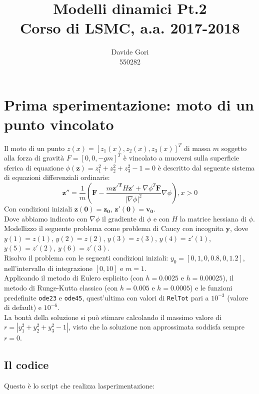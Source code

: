\documentclass{article}
\title{Modelli dinamici Pt.2\\
	Corso di LSMC, a.a. 2017-2018}
\author{Davide Gori\\
	550282}
\begin{document}
	\maketitle
	\section{Prima sperimentazione: moto di un punto vincolato}
	Il moto di un punto $z(x) = [z_1(x), z_2(x), z_3(x)]^T$ di massa $m$ soggetto alla forza di	gravità $F=[0, 0, -gm]^T$ è vincolato a muoversi sulla superficie sferica di equazione $\phi(\mathbf{z})=z_1^2+z_2^2+z_3^2-1=0$ è descritto dal seguente sistema di equazioni differenziali ordinarie:
	$$\mathbf{z}''=\frac{1}{m} \left(\mathbf{F}-\frac{m\mathbf{z'^T}H\mathbf{z'}+\nabla\phi^T\mathbf{F}}{\left|\nabla\phi\right|^2} \nabla\phi\right), x>0$$
	Con condizioni iniziali $\mathbf{z(0)}=\mathbf{z_0}$, $\mathbf{z'(0)}=\mathbf{v_0}$.\\
	Dove abbiamo indicato con $\nabla\phi$ il gradiente di $\phi$ e con $H$ la matrice hessiana di $\phi$.\\
	Modellizzo il seguente problema come problema di Caucy con incognita $\mathbf{y}$, dove $y(1) = z(1)$, $y(2) = z(2)$, $y(3) = z(3)$, $y(4) = z'(1)$, $y(5) = z'(2)$, $y(6) = z'(3)$.\\
	Risolvo il problema con le seguenti condizioni iniziali: $y_0=[0, 1, 0, 0.8, 0, 1.2]$, nell'intervallo di integrazione $[0, 10]$ e $m=1$.\\
	Applicando il metodo di Eulero esplicito (con $h = 0.0025$ e $h = 0.00025$), il metodo di Runge-Kutta classico (con $h = 0.005$ e $h = 0.0005$) e le funzioni predefinite {\tt ode23} e {\tt ode45}, quest'ultima con valori di {\tt RelTot} pari a $10^{-3}$ (valore di default) e $10^{-6}$.\\
	La bontà della soluzione si può stimare calcolando il massimo valore di $r=\left|y_1^2+y_2^2+y_3^2-1\right|$, visto che la soluzione non approssimata soddisfa sempre $r=0$.
	\subsection{Il codice}
	Questo è lo script che realizza lasperimentazione:
	
\end{document}
